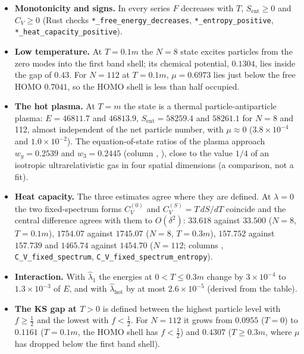 \documentclass[11pt]{article}
\begin{document}
\begin{itemize}
\item \textbf{Monotonicity and signs.} In every series $F$ decreases with $T$, $S_{\mathrm{ent}}\ge0$ and $C_V\ge0$ (Rust checks \texttt{*\_free\_e\allowbreak{}nergy\_de\allowbreak{}creases}, \texttt{*\_entrop\allowbreak{}y\_positi\allowbreak{}ve}, \texttt{*\_heat\_c\allowbreak{}apacity\_\allowbreak{}positive}).
\item \textbf{Low temperature.} At $T=0.1m$ the $N=8$ state excites particles from the zero modes into the first band shell; its chemical potential, $0.1304$, lies inside the gap of $0.43$. For $N=112$ at $T=0.1m$, $\mu=0.6973$ lies just below the free HOMO $0.7041$, so the HOMO shell is less than half occupied.
\item \textbf{The hot plasma.} At $T=m$ the state is a thermal particle-antiparticle plasma: $E=46811.7$ and $46813.9$, $S_{\mathrm{ent}}=58259.4$ and $58261.1$ for $N=8$ and 112, almost independent of the net particle number, with $\mu\approx0$ ($3.8\times10^{-4}$ and $1.0\times10^{-2}$). The equation-of-state ratios of the plasma approach $w_y=0.2539$ and $w_3=0.2445$ (column \texttt{}, \texttt{}), close to the value $1/4$ of an isotropic ultrarelativistic gas in four spatial dimensions (a comparison, not a fit).
\item \textbf{Heat capacity.} The three estimates agree where they are defined. At $\lambda=0$ the two fixed-spectrum forms $C_V^{(0)}$ and $C_V^{(S)}=T\,dS/dT$ coincide and the central difference agrees with them to $O(\delta^2)$: $33.618$ against $33.500$ ($N=8$, $T=0.1m$), $1754.07$ against $1745.07$ ($N=8$, $T=0.3m$), $157.752$ against $157.739$ and $1465.74$ against $1454.70$ ($N=112$; columns \texttt{}, \texttt{C\_V\_fixe\allowbreak{}d\_spectr\allowbreak{}um}, \texttt{C\_V\_fixe\allowbreak{}d\_spectr\allowbreak{}um\_entro\allowbreak{}py}).
\item \textbf{Interaction.} With $\hat\lambda_1$ the energies at $0<T\le0.3m$ change by $3\times10^{-4}$ to $1.3\times10^{-3}$ of $E$, and with $\hat\lambda_{\mathrm{hot}}$ by at most $2.6\times10^{-5}$ (derived from the table).
\item \textbf{The KS gap at $T>0$} is defined between the highest particle level with $f\ge\tfrac12$ and the lowest with $f<\tfrac12$. For $N=112$ it grows from $0.0955$ ($T=0$) to $0.1161$ ($T=0.1m$, the HOMO shell has $f<\tfrac12$) and $0.4307$ ($T\ge0.3m$, where $\mu$ has dropped below the first band shell).
\end{itemize}
\end{document}

